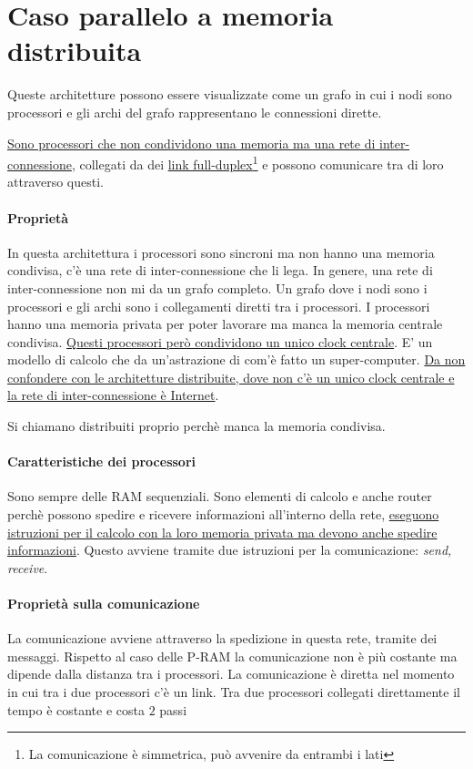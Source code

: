 \section{Caso parallelo a memoria distribuita}
Queste architetture possono essere visualizzate come un grafo in cui i nodi sono processori e gli archi del grafo rappresentano le connessioni dirette.

\uline{Sono processori che non condividono una memoria ma una rete di inter-connessione}, collegati da dei \uline{link full-duplex}\footnote{La comunicazione è simmetrica, può avvenire da entrambi i lati} e possono comunicare tra di loro attraverso questi. 

\paragraph{Proprietà}
In questa architettura i processori sono sincroni ma non hanno una memoria condivisa, c'è una rete di inter-connessione che li lega. In genere, una rete di inter-connessione non mi da un grafo completo. Un grafo dove i nodi sono i processori e gli archi sono i collegamenti diretti tra i processori. I processori hanno una memoria privata per poter lavorare ma manca la memoria centrale condivisa. \uline{Questi processori però condividono un unico clock centrale}. E' un modello di calcolo che da un'astrazione di com'è fatto un super-computer. \uline{Da non confondere con le architetture distribuite, dove non c'è un unico clock centrale e la rete di inter-connessione è Internet}.

Si chiamano distribuiti proprio perchè manca la memoria condivisa.

\paragraph{Caratteristiche dei processori}
Sono sempre delle RAM sequenziali. Sono elementi di calcolo e anche router perchè possono spedire e ricevere informazioni all'interno della rete, \uline{eseguono istruzioni per il calcolo con la loro memoria privata ma devono anche spedire informazioni}. Questo avviene tramite due istruzioni per la comunicazione: \textit{send, receive}.

\paragraph{Proprietà sulla comunicazione} La comunicazione avviene attraverso la spedizione in questa rete, tramite dei messaggi. Rispetto al caso delle P-RAM la comunicazione non è più costante ma dipende dalla distanza tra i processori. La comunicazione è diretta nel momento in cui tra i due processori c'è un link. Tra due processori collegati direttamente il tempo è costante e costa $2$ passi

